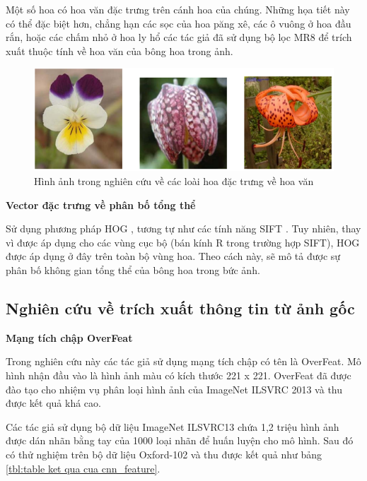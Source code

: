 \documentclass[12pt]{report}
\begin{document}
		Một số hoa có hoa văn đặc trưng trên cánh hoa của chúng. Những họa tiết này có thể đặc biệt hơn, chẳng hạn các sọc của hoa păng xê, các ô vuông ở hoa đầu rắn, hoặc các chấm nhỏ ở hoa ly hổ các tác giả đã sử dụng bộ lọc MR8 \cite{cia_MR8} để trích xuất thuộc tính về hoa văn của bông hoa trong ảnh.
		\begin{figure}[h]
			\centering
			\includegraphics[scale=0.5]{anh_hoa_cau_truc}
			\caption{Hình ảnh trong nghiên cứu \cite{cia-Nilsback06} về các loài hoa đặc trưng về hoa văn}
			\label{fig:anh_hoa_khacnhau_hoavan}
		\end{figure}
																												
		
																												
		\textbf{Vector đặc trưng về phân bố tổng thể}
																												
		Sử dụng phương pháp HOG \cite{cia_HOG}, tương tự như các tính năng SIFT \cite{cia_SIFT}. Tuy nhiên, thay vì được áp dụng cho 
		các vùng cục bộ (bán kính R trong trường hợp SIFT\cite{cia_SIFT}), HOG được áp dụng ở đây trên toàn bộ vùng hoa. Theo cách này, sẽ mô tả được sự phân bố không gian tổng thể của bông hoa trong bức ảnh.
																												
		\subsection{Nghiên cứu về trích xuất thông tin từ ảnh gốc}
																												
		\textbf{Mạng tích chập OverFeat \cite{cia-CNNFeatures off-the-shelf}}
		
		Trong nghiên cứu này \cite{cia-CNNFeatures off-the-shelf} các tác giả sử dụng mạng tích chập có tên là OverFeat. 
		Mô hình nhận đầu vào là hình ảnh màu có kích thước 221 x 221. OverFeat đã được đào tạo cho nhiệm vụ phân loại hình ảnh của ImageNet ILSVRC 2013 và thu được kết quả khá cao.
																										
		Các tác giả sử dụng bộ dữ liệu ImageNet ILSVRC13 
		\cite{cia_ImageNet ILSVRC 2013} chứa 1,2 triệu hình ảnh được 
		dán nhãn bằng tay của 1000 loại nhãn để huấn luyện cho mô hình. 
		Sau đó có thử nghiệm trên bộ dữ liệu Oxford-102 \cite{cia-Nilsback06} và thu được kết quả như bảng \ref{tbl:table ket qua cua cnn_feature}.
																										
\end{document}
